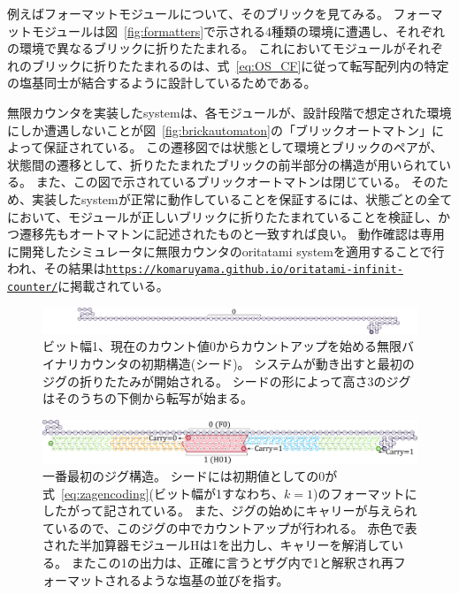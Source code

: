 \documentclass[a4,11pt]{article}
\begin{document}
例えばフォーマットモジュールについて、そのブリックを見てみる。
フォーマットモジュールは図~\ref{fig:formatters}で示される4種類の環境に遭遇し、それぞれの環境で異なるブリックに折りたたまれる。
これにおいてモジュールがそれぞれのブリックに折りたたまれるのは、式~\eqref{eq:OS_CF}に従って転写配列内の特定の塩基同士が結合するように設計しているためである。

無限カウンタを実装したsystemは、各モジュールが、設計段階で想定された環境にしか遭遇しないことが図~\ref{fig:brickautomaton}の「ブリックオートマトン」によって保証されている。
この遷移図では状態として環境とブリックのペアが、状態間の遷移として、折りたたまれたブリックの前半部分の構造が用いられている。
また、この図で示されているブリックオートマトンは閉じている。
そのため、実装したsystemが正常に動作していることを保証するには、状態ごとの全てにおいて、モジュールが正しいブリックに折りたたまれていることを検証し、かつ遷移先もオートマトンに記述されたものと一致すれば良い。
動作確認は専用に開発したシミュレータに無限カウンタのoritatami systemを適用することで行われ、その結果は\href{https://komaruyama.github.io/oritatami-infinit-counter/}{\texttt{https://komaruyama.github.io/oritatami-infinit-counter/}}に掲載されている。

\newpage
%
%
%
\begin{figure}[h]
\centering
\includegraphics[width=\linewidth]{fig/svg/zigzag01.pdf}
\caption{
ビット幅1、現在のカウント値0からカウントアップを始める無限バイナリカウンタの初期構造(シード)。
システムが動き出すと最初のジグの折りたたみが開始される。
シードの形によって高さ3のジグはそのうちの下側から転写が始まる。
}
\label{fig:counterseed}
\end{figure}

\begin{figure}[h]
\centering
\includegraphics[width=\linewidth]{fig/svg/CounterEx5_1.pdf}
\caption{
一番最初のジグ構造。
シードには初期値としての0が式~\eqref{eq:zagencoding}(ビット幅が1すなわち、$k=1$)のフォーマットにしたがって記されている。
また、ジグの始めにキャリーが与えられているので、このジグの中でカウントアップが行われる。
赤色で表された半加算器モジュールHは1を出力し、キャリーを解消している。
またこの1の出力は、正確に言うとザグ内で1と解釈され再フォーマットされるような塩基の並びを指す。
}

\label{fig:counter1stzig}
\end{figure}
\end{document}
